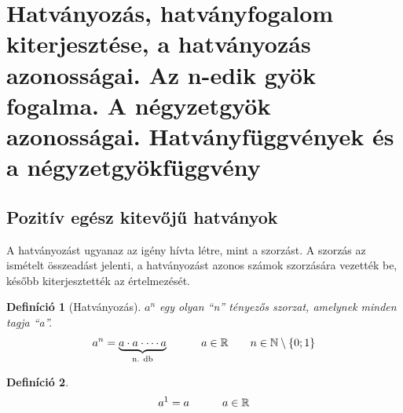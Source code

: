 \documentclass[12pt,a4paper]{article}
\newtheorem{definition}{Definíció} [section]
\begin{document}
\newpage





\section{Hatványozás, hatványfogalom kiterjesztése, a hatványozás azonosságai. Az n-edik gyök fogalma. A négyzetgyök azonosságai. Hatványfüggvények és a négyzetgyökfüggvény}

\subsection{Pozitív egész kitevőjű hatványok}
A hatványozást ugyanaz az igény hívta létre, mint a szorzást. A szorzás az ismételt összeadást jelenti, a hatványozást azonos számok szorzására vezették be, később kiterjesztették az értelmezését.

\begin{definition}[Hatványozás]
$a^n$ egy olyan ``n'' tényezős szorzat, amelynek minden tagja ``a''. \\
$$a^n = \underbrace{a\cdot a\cdot \cdots a}_{\text{n. db}} \hspace{30px} a \in \mathbb{R} \hspace{20px} n \in \mathbb{N} \setminus \lbrace0; 1\rbrace$$
\end{definition}
\begin{definition}
$$a^1=a\hspace{30px} a \in \mathbb{R}$$
\end{definition}
\end{document}
